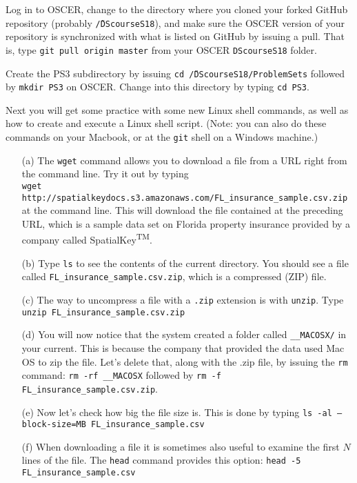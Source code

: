 \documentclass[12pt,english]{exam}
\begin{document}
\begin{questions}
\question Log in to OSCER, change to the directory where you cloned your forked GitHub repository (probably \texttt{\~/DScourseS18}), and make sure the OSCER version of your repository is synchronized with what is listed on GitHub by issuing a pull. That is, type \texttt{git pull origin master} from your OSCER \texttt{DScourseS18} folder. 

\question Create the PS3 subdirectory by issuing \texttt{cd \~/DScourseS18/ProblemSets} followed by \texttt{mkdir PS3} on OSCER. Change into this directory by typing \texttt{cd PS3}.

\question Next you will get some practice with some new Linux shell commands, as well as how to create and execute a Linux shell script. (Note: you can also do these commands on your Macbook, or at the \texttt{git} shell on a Windows machine.)
\begin{itemize}
	\item[(a)] The \texttt{wget} command allows you to download a file from a URL right from the command line. Try it out by typing\\ \texttt{wget http://spatialkeydocs.s3.amazonaws.com/FL\_insurance\_sample.csv.zip} at the command line. This will download the file contained at the preceding URL, which is a sample data set on Florida property insurance provided by a company called SpatialKey\textsuperscript{TM}.
	\item[(b)] Type \texttt{ls} to see the contents of the current directory. You should see a file called \texttt{FL\_insurance\_sample.csv.zip}, which is a compressed (ZIP) file.
	\item[(c)] The way to uncompress a file with a \texttt{.zip} extension is with \texttt{unzip}. Type \texttt{unzip FL\_insurance\_sample.csv.zip}
	\item[(d)] You will now notice that the system created a folder called \texttt{\_\_MACOSX/} in your current. This is because the company that provided the data used Mac OS to zip the file. Let's delete that, along with the .zip file, by issuing the \texttt{rm} command: \texttt{rm -rf \_\_MACOSX} followed by \texttt{rm -f FL\_insurance\_sample.csv.zip}. 
	\item[(e)] Now let's check how big the file size is. This is done by typing \texttt{ls -al --block-size=MB FL\_insurance\_sample.csv}
	\item[(f)] When downloading a file it is sometimes also useful to examine the first $N$ lines of the file. The \texttt{head} command provides this option: \texttt{head -5 FL\_insurance\_sample.csv}

\end{itemize}
\end{questions}
\end{document}
